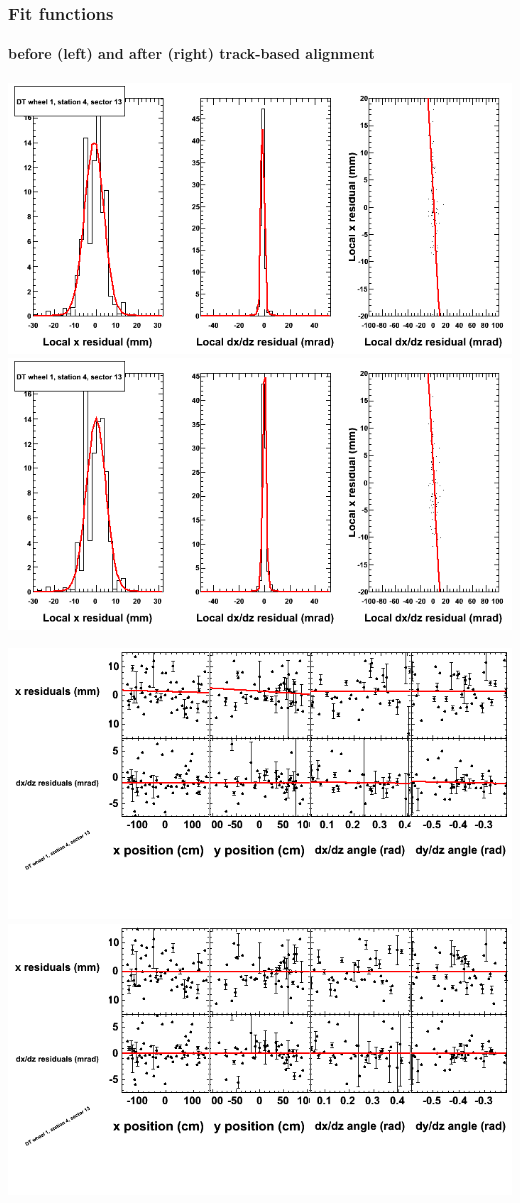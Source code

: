 \documentclass[compress]{beamer}
\begin{document}
\begin{frame}
\frametitle{Fit functions}
\framesubtitle{before (left) and after (right) track-based alignment}
\includegraphics[width=0.5\linewidth]{fitfunctions_re01/MBwhDst4sec13_bellcurves.png} \includegraphics[width=0.5\linewidth]{fitfunctions_re05/MBwhDst4sec13_bellcurves.png}

\includegraphics[width=0.5\linewidth]{fitfunctions_re01/MBwhDst4sec13_polynomials.png} \includegraphics[width=0.5\linewidth]{fitfunctions_re05/MBwhDst4sec13_polynomials.png}
\end{frame}
\end{document}
